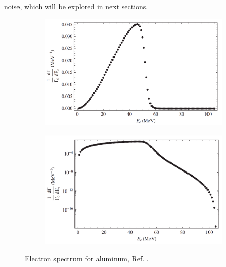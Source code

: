 noise, which will be explored in next sections.
\begin{figure}[!h]
     \begin{subfigure}[b]{0.4\linewidth}
         \centering
         \includegraphics[scale = 0.18]{figures/png/Screenshot_20240222_175415.png}
         \label{fig:linearscalemichel}
     \end{subfigure}
     \begin{subfigure}[b]{0.7\linewidth}
         \centering
         \includegraphics[scale = 0.18]{figures/png/Screenshot_20240222_175446.png}
         \label{fig:logscalemichel}
     \end{subfigure}
     \caption{Electron spectrum for aluminum, Ref. \cite{PhysRevD.84.013006}.}
        \label{fig:michel}
\end{figure}

